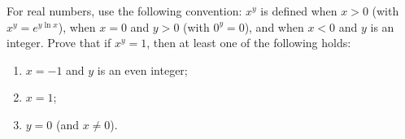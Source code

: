 For real numbers, use the following convention: $x^y$ is defined when $x>0$ (with $x^y=e^{y\ln x}$), when $x=0$ and $y>0$ (with $0^y=0$), and when $x<0$ and $y$ is an integer. Prove that if $x^y=1$, then at least one of the following holds:
\begin{enumerate}
\item[(a)] $x=-1$ and $y$ is an even integer;
\item[(b)] $x=1$;
\item[(c)] $y=0$ (and $x\ne0$).
\end{enumerate}
